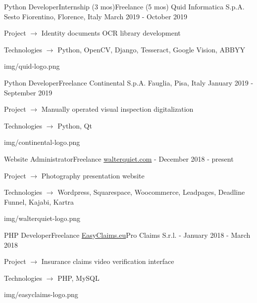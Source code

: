 
\begin{cventries}

  \logocventry
    {Python Developer{\enskip\cdotp\enskip}Internship (3 mos){\enskip\cdotp\enskip}Freelance (5 mos)}
    {Quid Informatica S.p.A.}
    {Sesto Fiorentino, Florence, Italy}
    {March 2019 - October 2019}
    {
      \begin{cvitems}
        \item {Project $\rightarrow$ Identity documents OCR library development}
        \item {Technologies $\rightarrow$ Python, OpenCV, Django, Tesseract, Google Vision, ABBYY}
      \end{cvitems}
    }
    {img/quid-logo.png}

  \logocventry
    {Python Developer{\enskip\cdotp\enskip}Freelance}
    {Continental S.p.A.}
    {Fauglia, Pisa, Italy}
    {January 2019 - September 2019}
    {
      \begin{cvitems}
        \item {Project $\rightarrow$ Manually operated visual inspection digitalization}
        \item {Technologies $\rightarrow$ Python, Qt}
      \end{cvitems}
    }
    {img/continental-logo.png}

  \logocventry
    {Website Administrator{\enskip\cdotp\enskip}Freelance}
    {\href{https://www.walterquiet.com}{walterquiet.com}}
    {-}
    {December 2018 - present}
    {
      \begin{cvitems}
        \item {Project $\rightarrow$ Photography presentation website}
        \item {Technologies $\rightarrow$ Wordpress, Squarespace, Woocommerce, Leadpages, Deadline Funnel, Kajabi, Kartra}
      \end{cvitems}
    }
    {img/walterquiet-logo.png}

  \logocventry
    {PHP Developer{\enskip\cdotp\enskip}Freelance}
    {\href{https://www.easyclaims.eu}{EasyClaims.eu}{\enskip\cdotp\enskip}Pro Claims S.r.l.}
    {-}
    {January 2018 - March 2018}
    {
      \begin{cvitems}
        \item {Project $\rightarrow$ Insurance claims video verification interface}
        \item {Technologies $\rightarrow$ PHP, MySQL}
      \end{cvitems}
    }
    {img/easyclaims-logo.png}


\end{cventries}
